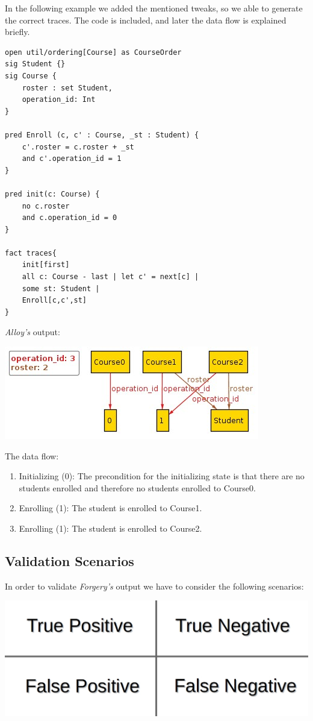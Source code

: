 \documentclass[oneside]{book}
\begin{document}
In the following example we added the mentioned tweaks, so we able to generate the correct traces. The code is included, and later the data flow is explained briefly.\\

\begin{lstlisting}
open util/ordering[Course] as CourseOrder
sig Student {}
sig Course {
	roster : set Student,
	operation_id: Int
}

pred Enroll (c, c' : Course, _st : Student) {
	c'.roster = c.roster + _st
	and c'.operation_id = 1 
}

pred init(c: Course) {
	no c.roster
	and c.operation_id = 0
}

fact traces{
    init[first]
    all c: Course - last | let c' = next[c] | 
	some st: Student |
	Enroll[c,c',st]
}
\end{lstlisting}

\textit{Alloy's} output:\\
\begin{center}
\includegraphics[scale=0.7]{output_traces}
\end{center}

The data flow:
\begin{enumerate}
	\item Initializing (0): The precondition for the initializing state is that there are no students enrolled and therefore no students enrolled to Course0.
	\item Enrolling (1): The student is enrolled to Course1.
	\item Enrolling (1): The student is enrolled to Course2.
\end{enumerate}

\subsection{Validation Scenarios}

In order to validate \textit{Forgery's} output we have to consider the following scenarios:
\begin{center}
\includegraphics[scale=0.25]{scenarios}
\end{center}
\end{document}

